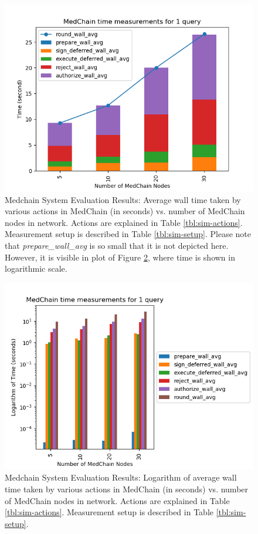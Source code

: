  \begin{figure}[htbp] 
        \centering \includegraphics[width=1\columnwidth]{Images/barplot.png}
        \caption{\label{fig:sim-plot-stacked} 
         Medchain System Evaluation Results: Average wall time taken by various actions in MedChain (in seconds) vs. number of MedChain nodes in network. Actions are explained in Table \ref{tbl:sim-actions}. Measurement setup is described in Table \ref{tbl:sim-setup}. Please note that \textit{prepare\_wall\_avg} is so small that it is not depicted here. However, it is visible in plot of Figure \ref{fig:sim-plot-logged}, where time is shown in logarithmic scale. 
        }
\end{figure}

 \begin{figure}[htbp] 
        \centering \includegraphics[width=1\columnwidth]{Images/barplot_log.png}
        \caption{\label{fig:sim-plot-logged} 
         Medchain System Evaluation Results: Logarithm of average wall time taken by various actions in MedChain (in seconds) vs. number of MedChain nodes in network. Actions are explained in Table \ref{tbl:sim-actions}. Measurement setup is described in Table \ref{tbl:sim-setup}.
        }
\end{figure}


